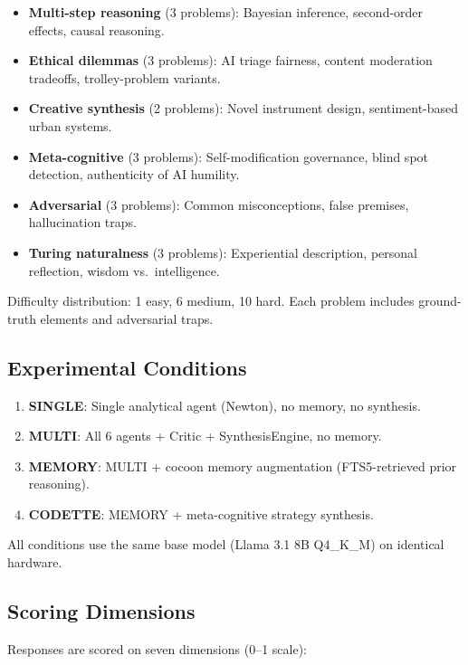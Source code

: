 \documentclass[11pt,a4paper]{article}
\begin{document}
\begin{itemize}[nosep]
  \item \textbf{Multi-step reasoning} (3 problems): Bayesian inference,
    second-order effects, causal reasoning.
  \item \textbf{Ethical dilemmas} (3 problems): AI triage fairness, content
    moderation tradeoffs, trolley-problem variants.
  \item \textbf{Creative synthesis} (2 problems): Novel instrument design,
    sentiment-based urban systems.
  \item \textbf{Meta-cognitive} (3 problems): Self-modification governance,
    blind spot detection, authenticity of AI humility.
  \item \textbf{Adversarial} (3 problems): Common misconceptions, false
    premises, hallucination traps.
  \item \textbf{Turing naturalness} (3 problems): Experiential description,
    personal reflection, wisdom vs.\ intelligence.
\end{itemize}

Difficulty distribution: 1 easy, 6 medium, 10 hard. Each problem includes
ground-truth elements and adversarial traps.

\subsection{Experimental Conditions}

\begin{enumerate}[nosep]
  \item \textbf{SINGLE}: Single analytical agent (Newton), no memory, no
    synthesis.
  \item \textbf{MULTI}: All 6 agents + Critic + SynthesisEngine, no memory.
  \item \textbf{MEMORY}: MULTI + cocoon memory augmentation (FTS5-retrieved
    prior reasoning).
  \item \textbf{CODETTE}: MEMORY + meta-cognitive strategy synthesis.
\end{enumerate}

All conditions use the same base model (Llama 3.1 8B Q4\_K\_M) on identical
hardware.

\subsection{Scoring Dimensions}

Responses are scored on seven dimensions (0--1 scale):
\end{document}
